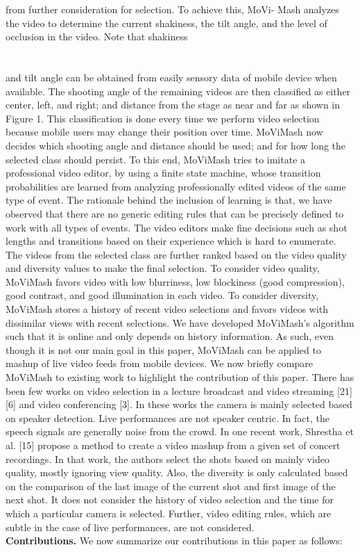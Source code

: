 \documentclass{sig-alternate}
\begin{document}
{{{from further consideration for selection. To achieve this, MoVi-
Mash analyzes the video to determine the current shakiness, the tilt
angle, and the level of occlusion in the video. Note that shakiness
\\\\\\
and tilt angle can be obtained from easily sensory data of mobile
device when available.
The shooting angle of the remaining videos are then classified as
either center, left, and right; and distance from the stage as near and
far as shown in Figure 1. This classification is done every time we
perform video selection because mobile users may change their position
over time. MoViMash now decides which shooting angle and
distance should be used; and for how long the selected class should
persist. To this end, MoViMash tries to imitate a professional video
editor, by using a finite state machine, whose transition probabilities
are learned from analyzing professionally edited videos of the
same type of event. The rationale behind the inclusion of learning
is that, we have observed that there are no generic editing rules
that can be precisely defined to work with all types of events. The
video editors make fine decisions such as shot lengths and transitions
based on their experience which is hard to enumerate.
The videos from the selected class are further ranked based on
the video quality and diversity values to make the final selection.
To consider video quality, MoViMash favors video with low blurriness,
low blockiness (good compression), good contrast, and good
illumination in each video. To consider diversity, MoViMash stores
a history of recent video selections and favors videos with dissimilar
views with recent selections.
We have developed MoViMash’s algorithm such that it is online
and only depends on history information. As such, even though
it is not our main goal in this paper, MoViMash can be applied to
mashup of live video feeds from mobile devices.
We now briefly compare MoViMash to existing work to highlight
the contribution of this paper. There has been few works on
video selection in a lecture broadcast and video streaming [21] [6]
and video conferencing [3]. In these works the camera is mainly
selected based on speaker detection. Live performances are not
speaker centric. In fact, the speech signals are generally noise from
the crowd. In one recent work, Shrestha et al. [15] propose a
method to create a video mashup from a given set of concert recordings.
In that work, the authors select the shots based on mainly
video quality, mostly ignoring view quality. Also, the diversity is
only calculated based on the comparison of the last image of the
current shot and first image of the next shot. It does not consider
the history of video selection and the time for which a particular
camera is selected. Further, video editing rules, which are subtle in
the case of live performances, are not considered.\\
{  }  \textbf{Contributions.} We now summarize our contributions in this paper
as follows:\\

}}}
\end{document}
